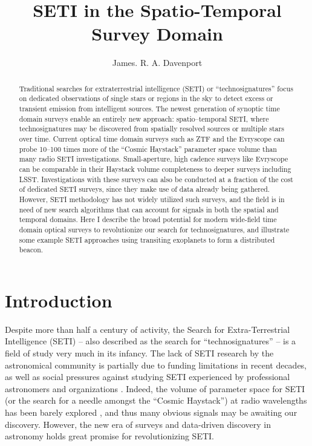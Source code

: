 \documentclass[twocolumn]{aastex62}
\begin{document}
\title{SETI in the Spatio-Temporal Survey Domain
}



\author{James. R. A. Davenport}


\begin{abstract}
Traditional searches for extraterrestrial intelligence (SETI) or ``technosignatures'' focus on dedicated observations of single stars or regions in the sky to detect excess or transient emission from intelligent sources. The newest generation of synoptic time domain surveys enable an entirely new approach: spatio--temporal SETI, where technosignatures may be discovered from spatially resolved sources or multiple stars over time. 
Current optical time domain surveys such as ZTF and the Evryscope can probe 10--100 times more of the ``Cosmic Haystack'' parameter space volume than many radio SETI investigations. Small-aperture, high cadence surveys like Evryscope can be comparable in their Haystack volume completeness to deeper surveys including LSST. Investigations with these surveys can also be conducted at a fraction of the cost of dedicated SETI surveys, since they make use of data already being gathered. 
However, SETI methodology has not widely utilized such surveys, and the field is in need of new search algorithms that can account for signals in both the spatial and temporal domains.
Here I describe the broad potential for modern wide-field time domain optical surveys to revolutionize our search for technosignatures, and illustrate some example SETI approaches using transiting exoplanets to form a distributed beacon.
\end{abstract}


\section{Introduction}

Despite more than half a century of activity, the Search for Extra-Terrestrial Intelligence (SETI) -- also described as the search for ``technosignatures'' -- is a field of study very much in its infancy. 
The lack of SETI research by the astronomical community is partially due to funding limitations in recent decades, as well as social pressures against studying SETI experienced by professional astronomers and organizations \citep{wright2018b}. 
Indeed, the volume of parameter space for SETI (or the search for a needle amongst the ``Cosmic Haystack'') at radio wavelengths has been barely explored \citet{wright2018c}, and thus many obvious signals may be awaiting our discovery. 
However, the new era of surveys and data-driven discovery in astronomy holds great promise for revolutionizing SETI.
\end{document}
